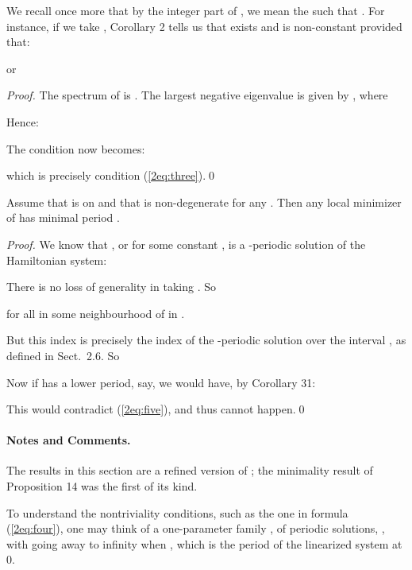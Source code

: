 \documentclass{llncs}
\begin{document}
We recall once more that by the integer part  of
, we mean the 
such that . For instance,
if we take , Corollary 2 tells
us that  exists and is
non-constant provided that:


or


\begin{proof}
The spectrum of  is . The
largest negative eigenvalue  is given by
,
where

Hence:


The condition  now becomes:

which is precisely condition (\ref{2eq:three}).\qed
\end{proof}

\begin{lemma}
Assume that  is  on  and
that  is non-de\-gen\-er\-ate for any . Then any local
minimizer  of  has minimal period .
\end{lemma}
\begin{proof}
We know that , or
 for some constant , is a -periodic solution of the Hamiltonian system:


There is no loss of generality in taking . So

for all  in some neighbourhood of  in
.

But this index is precisely the index
 of the -periodic
solution  over the interval
, as defined in Sect.~2.6. So


Now if  has a lower period,  say,
we would have, by Corollary 31:


This would contradict (\ref{2eq:five}), and thus cannot happen.\qed
\end{proof}
\paragraph{Notes and Comments.}
The results in this section are a
refined version of \cite{2clar:eke};
the minimality result of Proposition
14 was the first of its kind.

To understand the nontriviality conditions, such as the one in formula
(\ref{2eq:four}), one may think of a one-parameter family
, 
of periodic solutions, ,
with  going away to infinity when ,
which is the period of the linearized system at 0.
\end{document}
